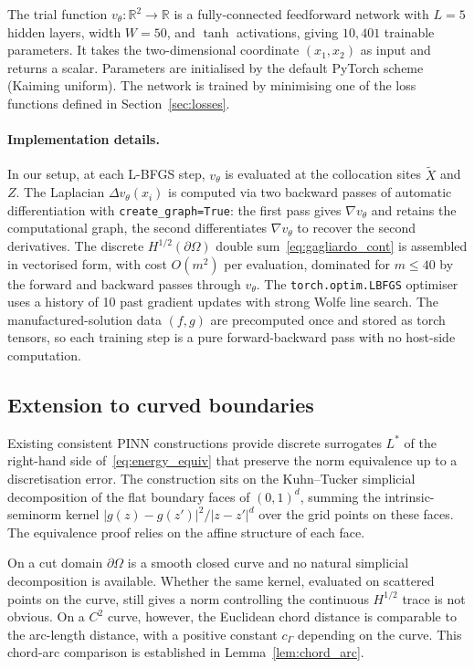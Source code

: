 \documentclass[11pt]{article}
\newcommand{\R}{\mathbb{R}}
\begin{document}
The trial function $v_\theta\colon\R^2\to\R$ is a fully-connected
feedforward network with $L=5$ hidden layers, width $W=50$, and
$\tanh$ activations, giving $10{,}401$ trainable parameters. It takes
the two-dimensional coordinate $(x_1,x_2)$ as input and returns a
scalar. Parameters are initialised by the default PyTorch scheme
(Kaiming uniform). The network is trained by minimising one of
the loss functions defined in Section~\ref{sec:losses}.

\paragraph{Implementation details.} In our setup, 
at each L-BFGS step, $v_\theta$ is evaluated at the collocation sites
$\tilde{X}$ and $Z$. The Laplacian $\Delta v_\theta(x_i)$ is computed
via two backward passes of automatic differentiation with
\texttt{create\_graph=True}: the first pass gives $\nabla v_\theta$
and retains the computational graph, the second differentiates
$\nabla v_\theta$ to recover the second derivatives. The discrete
$H^{1/2}(\partial\Omega)$ double sum~\eqref{eq:gagliardo_cont} is
assembled in vectorised form, with cost $O(m^2)$ per evaluation,
dominated for $m \le 40$ by the forward and backward passes through
$v_\theta$. The \texttt{torch.optim.LBFGS} optimiser uses a history
of 10 past gradient updates with strong Wolfe line search. The
manufactured-solution data $(f, g)$ are precomputed once and stored
as torch tensors, so each training step is a pure forward-backward
pass with no host-side computation.










\subsection{Extension to curved boundaries}

Existing consistent PINN constructions provide discrete surrogates
$L^*$ of the right-hand side of~\eqref{eq:energy_equiv} that
preserve the norm equivalence up to a discretisation error. The
construction sits on the Kuhn--Tucker simplicial decomposition of
the flat boundary faces of $(0,1)^d$, summing the intrinsic-seminorm
kernel $|g(z) - g(z')|^2 / |z - z'|^d$ over the grid points on
these faces. The equivalence proof relies on the affine structure
of each face.

On a cut domain $\partial\Omega$ is a smooth closed curve and no
natural simplicial decomposition is available. Whether the same
kernel, evaluated on scattered points on the curve, still gives a
norm controlling the continuous $H^{1/2}$ trace is not obvious. On
a $C^2$ curve, however, the Euclidean chord distance is comparable
to the arc-length distance, with a positive constant $c_\Gamma$
depending on the curve. This chord-arc comparison is established in
Lemma~\ref{lem:chord_arc}.
\end{document}
